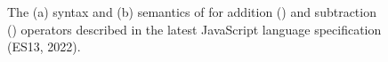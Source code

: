 \begin{figure}
\begin{subfigure}{\textwidth}
  \end{subfigure}
  \caption{
    The (a) syntax and (b) semantics of  for addition
    (\scode{+}) and subtraction (\scode{-}) operators described in the latest
    JavaScript language specification (ES13, 2022).
  }
  \label{fig:spec-additive}
\end{figure}

